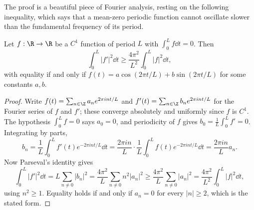 The proof is a beautiful piece of Fourier analysis, resting on the following inequality, which says that a mean-zero periodic function cannot oscillate slower than the fundamental frequency of its period.

\begin{lemma}
    Let $f: \R \rightarrow \R$ be a $C^1$ function of period $L$ with $\int_0^{L} f \dd t = 0$. Then
    $$
    \int_0^{L} |f'|^2 \dd t \geq \frac{4\pi^2}{L^2}\int_0^{L} |f|^2 \dd t,
    $$
    with equality if and only if $f(t) = a\cos(2\pi t/L) + b \sin(2\pi t/L)$ for some constants $a, b$.
\end{lemma}
\begin{proof}
    Write $f(t) = \sum_{n \in \Z} a_n e^{2\pi i n t/L}$ and $f'(t) = \sum_{n\in\Z} b_n e^{2\pi int/L}$ for the Fourier series of $f$ and $f'$; these converge absolutely and uniformly since $f$ is $C^1$. The hypothesis $\int_0^L f = 0$ says $a_0 = 0$, and periodicity of $f$ gives $b_0 = \frac{1}{L}\int_0^L f' = 0$. Integrating by parts,
    $$
    b_n = \frac{1}{L}\int_0^L f'(t)e^{-2\pi i n t/L}\dd t = \frac{2\pi i n}{L}\cdot \frac{1}{L}\int_0^L f(t) e^{-2\pi i nt/L}\dd t = \frac{2\pi i n}{L}a_n.
    $$
    Now Parseval's identity gives
    $$
    \int_0^L |f'|^2\dd t = L\sum_{n \neq 0}|b_n|^2 = \frac{4\pi^2}{L}\sum_{n\neq 0} n^2 |a_n|^2 \geq \frac{4\pi^2}{L}\sum_{n\neq 0}|a_n|^2 = \frac{4\pi^2}{L^2}\int_0^L |f|^2 \dd t,
    $$
    using $n^2 \geq 1$. Equality holds if and only if $a_n = 0$ for every $|n| \geq 2$, which is the stated form.
\end{proof}

